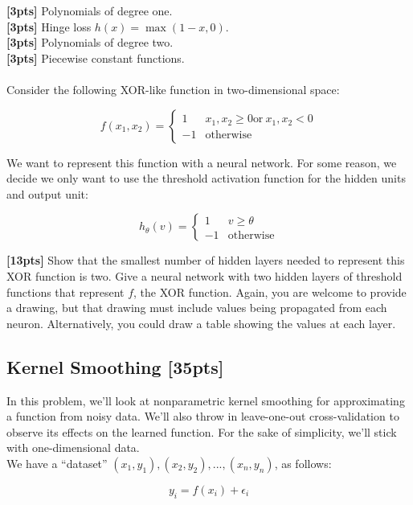 \documentclass[paper=a4, fontsize=11pt]{scrartcl} %
\numberwithin{figure}{section} %
\numberwithin{table}{section} %
\begin{document}
\textbf{[3pts]} Polynomials of degree one. \\

\textbf{[3pts]} Hinge loss $h(x) = \max(1 - x, 0)$. \\

\textbf{[3pts]} Polynomials of degree two. \\

\textbf{[3pts]} Piecewise constant functions. \\\\

Consider the following XOR-like function in two-dimensional space:

$$
f(x_1, x_2) = \begin{cases}
	1 & x_1, x_2 \ge 0 \textrm{or}\ x_1, x_2 < 0 \\
	-1 & \textrm{otherwise}
\end{cases}
$$

We want to represent this function with a neural network. For some reason, we decide we only want to use the threshold activation function for the hidden units and output unit:

$$
h_{\theta}(v) = \begin{cases}
	1 & v \ge \theta \\
	-1 & \textrm{otherwise}
\end{cases}
$$

\textbf{[13pts]} Show that the smallest number of hidden layers needed to represent this XOR function is two. Give a neural network with two hidden layers of threshold functions that represent $f$, the XOR function. Again, you are welcome to provide a drawing, but that drawing must include values being propagated from each neuron. Alternatively, you could draw a table showing the values at each layer.

\subsection{Kernel Smoothing \textbf{[35pts]}}

In this problem, we'll look at nonparametric kernel smoothing for approximating a function from noisy data. We'll also throw in leave-one-out cross-validation to observe its effects on the learned function. For the sake of simplicity, we'll stick with one-dimensional data. \\

We have a ``dataset'' $(x_1, y_1), (x_2, y_2), ..., (x_n, y_n)$, as follows:

$$
y_i = f(x_i) + \epsilon_i
$$
\end{document}
